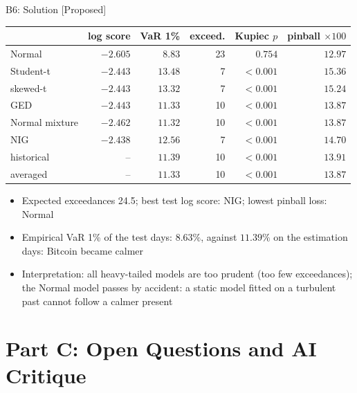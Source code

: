 \ifsolutions
\begin{frame}{B6: Solution [Proposed]}
\itemsize{\footnotesize}
\begin{center}
\scriptsize
\begin{tabular}{lrrrrr}
\toprule
& log score & VaR 1\% & exceed. & Kupiec $p$ & pinball $\times 100$ \\
\midrule
Normal & $-2.605$ & $8.83$ & 23 & $0.754$ & $12.97$ \\
Student-t & $-2.443$ & $13.48$ & 7 & $<0.001$ & $15.36$ \\
skewed-t & $-2.443$ & $13.32$ & 7 & $<0.001$ & $15.24$ \\
GED & $-2.443$ & $11.33$ & 10 & $<0.001$ & $13.87$ \\
Normal mixture & $-2.462$ & $11.32$ & 10 & $<0.001$ & $13.87$ \\
NIG & $-2.438$ & $12.56$ & 7 & $<0.001$ & $14.70$ \\
historical & -- & $11.39$ & 10 & $<0.001$ & $13.91$ \\
averaged & -- & $11.33$ & 10 & $<0.001$ & $13.87$ \\
\bottomrule
\end{tabular}
\end{center}
\begin{itemize}
    \item Expected exceedances 24.5; best test log score: NIG; lowest pinball loss: Normal
    \item Empirical VaR 1\% of the test days: $8.63\%$, against $11.39\%$ on the estimation days: Bitcoin became calmer
    \item Interpretation: all heavy-tailed models are too prudent (too few exceedances); the Normal model passes by accident: a static model fitted on a turbulent past cannot follow a calmer present
\end{itemize}
\end{frame}
\fi


\section{Part C: Open Questions and AI Critique}

